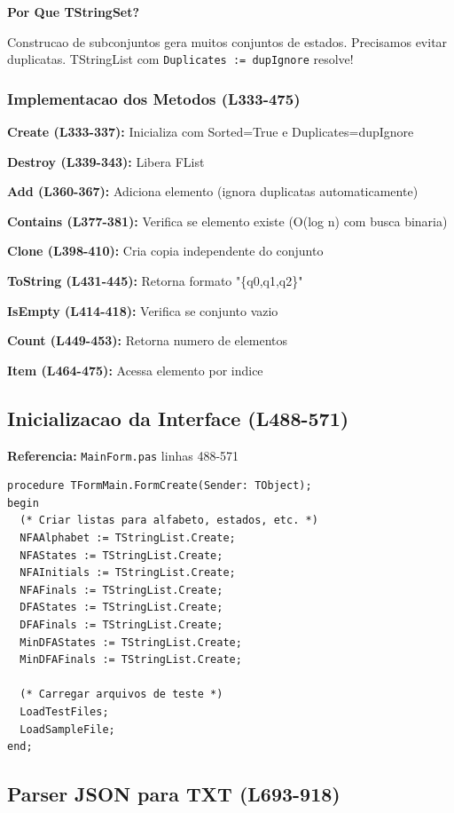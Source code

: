 \documentclass[12pt,a4paper]{article}
\begin{document}
\textbf{Por Que TStringSet?}

Construcao de subconjuntos gera muitos conjuntos de estados. Precisamos evitar duplicatas. TStringList com \texttt{Duplicates := dupIgnore} resolve!

\subsubsection{Implementacao dos Metodos (L333-475)}

\textbf{Create (L333-337):} Inicializa com Sorted=True e Duplicates=dupIgnore

\textbf{Destroy (L339-343):} Libera FList

\textbf{Add (L360-367):} Adiciona elemento (ignora duplicatas automaticamente)

\textbf{Contains (L377-381):} Verifica se elemento existe (O(log n) com busca binaria)

\textbf{Clone (L398-410):} Cria copia independente do conjunto

\textbf{ToString (L431-445):} Retorna formato "\{q0,q1,q2\}"

\textbf{IsEmpty (L414-418):} Verifica se conjunto vazio

\textbf{Count (L449-453):} Retorna numero de elementos

\textbf{Item (L464-475):} Acessa elemento por indice

\subsection{Inicializacao da Interface (L488-571)}

\textbf{Referencia:} \texttt{MainForm.pas} linhas 488-571

\begin{lstlisting}[style=pascal, caption={FormCreate}]
procedure TFormMain.FormCreate(Sender: TObject);
begin
  (* Criar listas para alfabeto, estados, etc. *)
  NFAAlphabet := TStringList.Create;
  NFAStates := TStringList.Create;
  NFAInitials := TStringList.Create;
  NFAFinals := TStringList.Create;
  DFAStates := TStringList.Create;
  DFAFinals := TStringList.Create;
  MinDFAStates := TStringList.Create;
  MinDFAFinals := TStringList.Create;
  
  (* Carregar arquivos de teste *)
  LoadTestFiles;
  LoadSampleFile;
end;
\end{lstlisting}

\subsection{Parser JSON para TXT (L693-918)}
\end{document}
